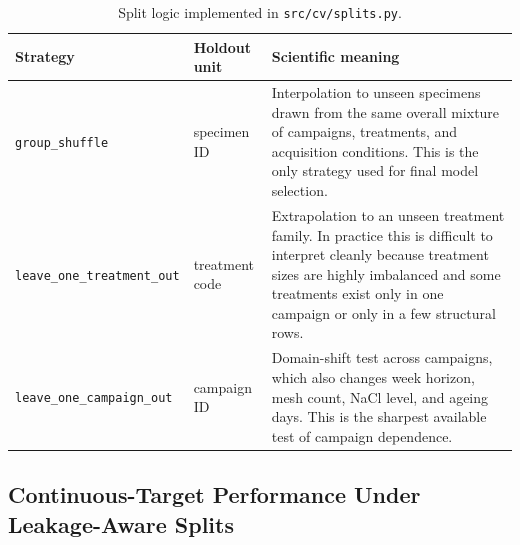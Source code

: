 \documentclass[11pt,a4paper]{article}
\begin{document}
\begin{table}[H]
\centering
\small
\begin{tabularx}{\textwidth}{P{3.0cm}P{3.0cm}L}
\toprule
\textbf{Strategy} & \textbf{Holdout unit} & \textbf{Scientific meaning} \\
\midrule
\texttt{group\_shuffle} & specimen ID & Interpolation to unseen specimens drawn from the same overall mixture of campaigns, treatments, and acquisition conditions. This is the only strategy used for final model selection. \\
\texttt{leave\_one\_treatment\_out} & treatment code & Extrapolation to an unseen treatment family. In practice this is difficult to interpret cleanly because treatment sizes are highly imbalanced and some treatments exist only in one campaign or only in a few structural rows. \\
\texttt{leave\_one\_campaign\_out} & campaign ID & Domain-shift test across campaigns, which also changes week horizon, mesh count, NaCl level, and ageing days. This is the sharpest available test of campaign dependence. \\
\bottomrule
\end{tabularx}
\caption{Split logic implemented in \texttt{src/cv/splits.py}.}
\label{tab:splits}
\end{table}

\subsection{Continuous-Target Performance Under Leakage-Aware Splits}
\end{document}
